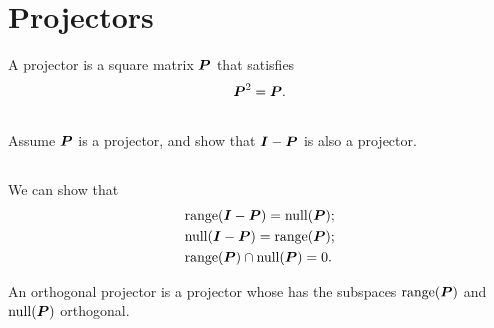 \documentclass[11pt,letterpaper]{article}
\begin{document}


\section{Projectors}
A projector is a square matrix $\boldsymbol{P}$ that satisfies
\begin{align*}
    \boldsymbol{P}^2 = \boldsymbol{P}.
\end{align*}

\subsection{}
Assume $\boldsymbol{P}$ is a projector, and show that $\boldsymbol{I}-\boldsymbol{P}$ is also a projector.

\subsection{}
We can show that
\begin{align*}
    & \text{range}(\boldsymbol{I}-\boldsymbol{P}) = \text{null}(\boldsymbol{P});\\
    & \text{null}(\boldsymbol{I}-\boldsymbol{P}) = \text{range}(\boldsymbol{P});\\
    & \text{range}(\boldsymbol{P}) \cap \text{null}(\boldsymbol{P}) = 0.
\end{align*}

An orthogonal projector is a projector whose has the subspaces $\text{range}(\boldsymbol{P})$ and $\text{null}(\boldsymbol{P})$ orthogonal.
\end{document}
